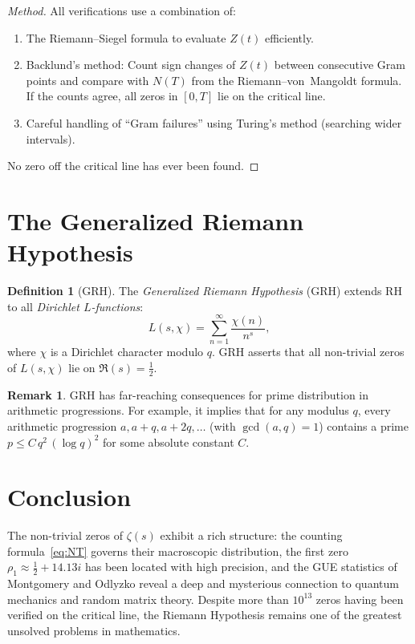 \documentclass[12pt,a4paper]{amsart}
\theoremstyle{definition}
\newtheorem{definition}[theorem]{Definition}
\newtheorem{remark}[theorem]{Remark}
\begin{document}
\begin{proof}[Method]
All verifications use a combination of:
\begin{enumerate}
  \item The Riemann--Siegel formula to evaluate $Z(t)$ efficiently.
  \item Backlund's method: Count sign changes of $Z(t)$ between consecutive
    Gram points and compare with $N(T)$ from the Riemann--von~Mangoldt formula.
    If the counts agree, all zeros in $[0,T]$ lie on the critical line.
  \item Careful handling of ``Gram failures'' using Turing's method
    (searching wider intervals).
\end{enumerate}
No zero off the critical line has ever been found.
\end{proof}

\section{The Generalized Riemann Hypothesis}

\begin{definition}[GRH]
\label{def:grh}
The \emph{Generalized Riemann Hypothesis} (GRH) extends RH to all
\emph{Dirichlet $L$-functions}:
\[
  L(s, \chi) = \sum_{n=1}^{\infty} \frac{\chi(n)}{n^s},
\]
where $\chi$ is a Dirichlet character modulo $q$.
GRH asserts that all non-trivial zeros of $L(s,\chi)$ lie on $\Re(s) = \tfrac{1}{2}$.
\end{definition}

\begin{remark}
GRH has far-reaching consequences for prime distribution in arithmetic
progressions.  For example, it implies that for any modulus $q$, every
arithmetic progression $a, a+q, a+2q, \ldots$ (with $\gcd(a,q)=1$)
contains a prime $p \le C\,q^2\,(\log q)^2$ for some absolute constant $C$.
\end{remark}

\section{Conclusion}

The non-trivial zeros of $\zeta(s)$ exhibit a rich structure: the counting
formula~\eqref{eq:NT} governs their macroscopic distribution, the first
zero $\rho_1 \approx \tfrac{1}{2} + 14.13i$ has been located with high
precision, and the GUE statistics of Montgomery and Odlyzko reveal a deep
and mysterious connection to quantum mechanics and random matrix theory.
Despite more than $10^{13}$ zeros having been verified on the critical line,
the Riemann Hypothesis remains one of the greatest unsolved problems in
mathematics.
\end{document}
